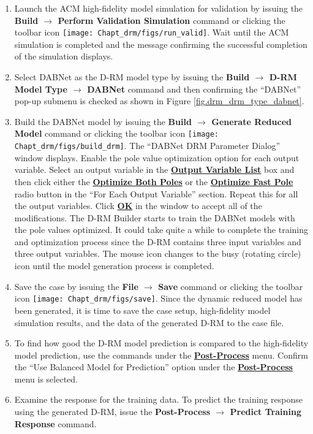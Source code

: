 \begin{enumerate}
	\item Launch the ACM high-fidelity model simulation for validation by issuing the \textbf{Build $\rightarrow$ Perform Validation Simulation} command or clicking the toolbar icon \texttt{[image: Chapt\_drm/figs/run\_valid]}.  Wait until the ACM simulation is completed and the message confirming the successful completion of the simulation displays.
	\item Select DABNet as the D-RM model type by issuing the \textbf{Build $\rightarrow$ D-RM Model Type $\rightarrow$ DABNet} command and then confirming the ``DABNet'' pop-up submenu is checked as shown in Figure \ref{fig.drm_drm_type_dabnet}.
	\item Build the DABNet model by issuing the \textbf{Build $\rightarrow$ Generate Reduced Model} command or clicking the toolbar icon \texttt{[image: Chapt\_drm/figs/build\_drm]}.  The ``DABNet DRM Parameter Dialog'' window displays.  Enable the pole value optimization option for each output variable.  Select an output variable in the \textbf{\underline{Output Variable List}} box and then click either the \textbf{\underline{Optimize Both Poles}} or the \textbf{\underline{Optimize Fast Pole}} radio button in the ``For Each Output Variable'' section.  Repeat this for all the output variables.  Click \textbf{\underline{OK}} in the window to accept all of the modifications.  The D-RM Builder starts to train the DABNet models with the pole values optimized.  It could take quite a while to complete the training and optimization process since the D-RM contains three input variables and three output variables.  The mouse icon changes to the busy (rotating circle) icon until the model generation process is completed.
	\item Save the case by issuing the \textbf{File $\rightarrow$ Save} command or clicking the toolbar icon \texttt{[image: Chapt\_drm/figs/save]}.  Since the dynamic reduced model has been generated, it is time to save the case setup, high-fidelity model simulation results, and the data of the generated D-RM to the case file.
	\item To find how good the D-RM model prediction is compared to the high-fidelity model prediction, use the commands under the \textbf{\underline{Post-Process}} menu.  Confirm the ``Use Balanced Model for Prediction'' option under the \textbf{\underline{Post-Process}} menu is selected. 
	\item Examine the response for the training data.  To predict the training response using the generated D-RM, issue the \textbf{Post-Process $\rightarrow$ Predict Training Response} command.

\end{enumerate}
